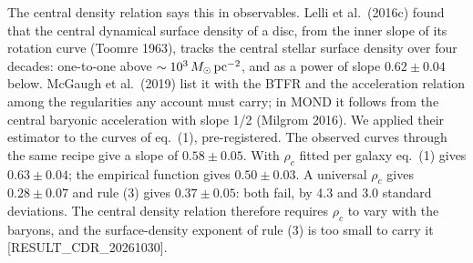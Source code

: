 \documentclass[
  10pt,
]{article}
\begin{document}
The central density relation says this in observables. Lelli et al.~(2016c) found that the central dynamical surface density of a disc, from the inner slope of its rotation curve (Toomre 1963), tracks the central stellar surface density over four decades: one-to-one above $\sim10^3\,M_\odot\,{\rm pc}^{-2}$, and as a power of slope $0.62\pm0.04$ below. McGaugh et al.~(2019) list it with the BTFR and the acceleration relation among the regularities any account must carry; in MOND it follows from the central baryonic acceleration with slope 1/2 (Milgrom 2016). We applied their estimator to the curves of eq.~(1), pre-registered. The observed curves through the same recipe give a slope of $0.58\pm0.05$. With $\rho_c$ fitted per galaxy eq.~(1) gives $0.63\pm0.04$; the empirical function gives $0.50\pm0.03$. A universal $\rho_c$ gives $0.28\pm0.07$ and rule (3) gives $0.37\pm0.05$: both fail, by 4.3 and 3.0 standard deviations. The central density relation therefore requires $\rho_c$ to vary with the baryons, and the surface-density exponent of rule (3) is too small to carry it {[}RESULT\_CDR\_20261030{]}.
\end{document}
